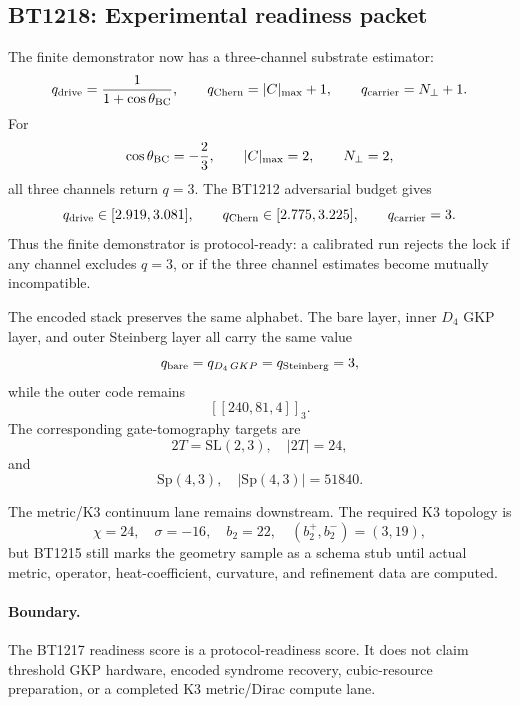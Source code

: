 \subsection{BT1218: Experimental readiness packet}
\label{sec:bt1218-experimental-readiness}

The finite demonstrator now has a three-channel substrate estimator:
\[
q_{\rm drive}=\frac{1}{1+\cos\theta_{\rm BC}},\qquad
q_{\rm Chern}=|C|_{\max}+1,\qquad
q_{\rm carrier}=N_\perp+1.
\]
For
\[
\cos\theta_{\rm BC}=-\frac23,\qquad |C|_{\max}=2,\qquad N_\perp=2,
\]
all three channels return \(q=3\).  The BT1212 adversarial budget gives
\[
q_{\rm drive}\in[2.919,3.081],\qquad
q_{\rm Chern}\in[2.775,3.225],\qquad
q_{\rm carrier}=3.
\]
Thus the finite demonstrator is protocol-ready: a calibrated run rejects the
lock if any channel excludes \(q=3\), or if the three channel estimates become
mutually incompatible.

The encoded stack preserves the same alphabet.  The bare layer, inner \(D_4\)
GKP layer, and outer Steinberg layer all carry the same value
\[
q_{\rm bare}=q_{D_4\,GKP}=q_{\rm Steinberg}=3,
\]
while the outer code remains
\[
[[240,81,4]]_3.
\]
The corresponding gate-tomography targets are
\[
2T=\mathrm{SL}(2,3),\quad |2T|=24,
\]
and
\[
\mathrm{Sp}(4,3),\quad |\mathrm{Sp}(4,3)|=51840.
\]

The metric/K3 continuum lane remains downstream.  The required K3 topology is
\[
\chi=24,\quad \sigma=-16,\quad b_2=22,\quad (b_2^+,b_2^-)=(3,19),
\]
but BT1215 still marks the geometry sample as a schema stub until actual metric,
operator, heat-coefficient, curvature, and refinement data are computed.

\paragraph{Boundary.}
The BT1217 readiness score is a protocol-readiness score.  It does not claim
threshold GKP hardware, encoded syndrome recovery, cubic-resource preparation,
or a completed K3 metric/Dirac compute lane.
